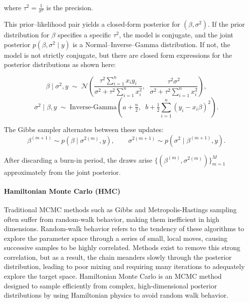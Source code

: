 \noindent
where \(\tau^2 = \frac{1}{\sigma^2}\) is the precision.

This prior--likelihood pair yields a closed-form posterior for \((\beta, \sigma^2)\).  
If the prior distribution for \(\beta\) specifies a specific \(\tau^2\), the model is conjugate, and the joint posterior \(p(\beta, \sigma^2 \mid y)\) is a Normal--Inverse--Gamma distribution\cite{murphy_conjugate_2007}.  
If not, the model is not strictly conjugate, but there are closed form expressions for the posterior distributions as shown here:

\[
\beta \mid \sigma^2, y \;\sim\;
\mathcal N\!\left(
\frac{\tau^2 \sum_{i=1}^n x_i y_i}{\sigma^2 + \tau^2 \sum_{i=1}^n x_i^2},\;\;
\frac{\tau^2 \sigma^2}{\sigma^2 + \tau^2 \sum_{i=1}^n x_i^2}
\right),
\]
\[
\sigma^2 \mid \beta, y \;\sim\;
\mathrm{Inverse\text{-}Gamma}\!\left(
a + \tfrac{n}{2},\;\;
b + \tfrac{1}{2}\sum_{i=1}^n (y_i - x_i\beta)^2
\right).
\]

The Gibbs sampler alternates between these updates:
\[
\beta^{(m+1)} \sim p(\beta \mid \sigma^{2(m)}, y),
\qquad
\sigma^{2(m+1)} \sim p(\sigma^2 \mid \beta^{(m+1)}, y).
\]

After discarding a burn-in period, the draws arise
$\{(\beta^{(m)}, \sigma^{2(m)})\}_{m=1}^M$ approximately from the joint posterior.

\paragraph{Hamiltonian Monte Carlo (HMC)}
Traditional MCMC methods such as Gibbs and Metropolis-Hastings sampling often suffer from
random-walk behavior, making them inefficient in high dimensions\cite{gelman_bayesian_2013}.  
Random-walk behavior refers to the tendency of these algorithms to explore the parameter space through a series of small, local moves, causing successive samples to be highly correlated.  
Methods exist to remove this strong correlation, but as a result, the chain meanders slowly through the posterior distribution, leading to poor mixing and requiring many iterations to adequately explore the target space.  
Hamiltonian Monte Carlo is an MCMC method designed to sample efficiently from complex, high-dimensional posterior distributions by using Hamiltonian physics to avoid random walk behavior\cite{betancourt_conceptual_2017}.  

